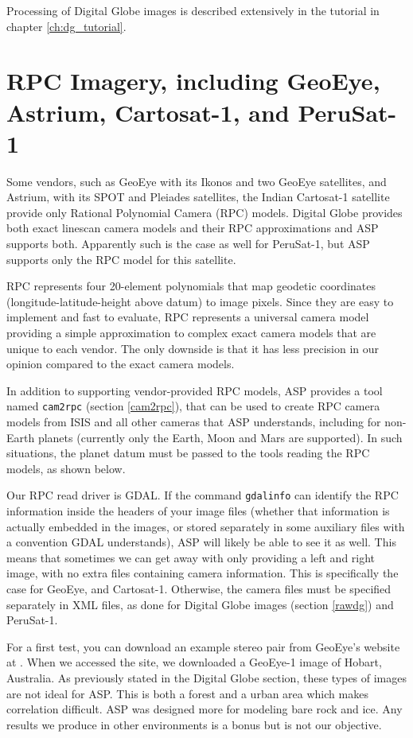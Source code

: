Processing of Digital Globe images is described extensively in the
tutorial in chapter \ref{ch:dg_tutorial}.

\section{RPC Imagery, including GeoEye, Astrium, Cartosat-1, and PeruSat-1}
\label{rpc}

Some vendors, such as GeoEye with its Ikonos and two GeoEye satellites,
and Astrium, with its SPOT and Pleiades satellites, the Indian Cartosat-1 
satellite provide only
Rational Polynomial Camera (RPC) models. Digital Globe provides both
exact linescan camera models and their RPC approximations and ASP supports both. 
Apparently such is the case as well for PeruSat-1, but ASP supports only 
the RPC model for this satellite. 

RPC represents four 20-element polynomials that map geodetic coordinates
(longitude-latitude-height above datum)
to image pixels. Since they are easy to implement and fast to
evaluate, RPC represents a universal camera model providing a simple
approximation to complex exact camera models that are unique to each
vendor. The only downside is that it has less precision in our
opinion compared to the exact camera models.

In addition to supporting vendor-provided RPC models, ASP provides a
tool named \texttt{cam2rpc} (section \ref{cam2rpc}), that can be used to
create RPC camera models from ISIS and all other cameras that ASP
understands, including for non-Earth planets (currently only the Earth, Moon
and Mars are supported). In such situations, the planet datum must be
passed to the tools reading the RPC models, as shown below.

Our RPC read driver is GDAL. If the command \texttt{gdalinfo} can
identify the RPC information inside the headers of your image files (whether
that information is actually embedded in the images, or stored
separately in some auxiliary files with a convention GDAL understands),
ASP will likely be able to see it as well. This means that sometimes we
can get away with only providing a left and right image, with no extra
files containing camera information. This is specifically the case for
GeoEye, and Cartosat-1. Otherwise, the camera files must be specified
separately in XML files, as done for Digital Globe images (section
\ref{rawdg}) and PeruSat-1.

For a first test, you can download an example stereo pair from GeoEye's
website at \cite{geoeye:samples}. When we accessed the site, we
downloaded a GeoEye-1 image of Hobart, Australia. As previously stated
in the Digital Globe section, these types of images are not ideal for
ASP. This is both a forest and a urban area which makes correlation
difficult. ASP was designed more for modeling bare rock and ice. Any
results we produce in other environments is a bonus but is not our
objective.

